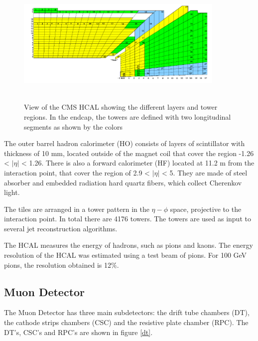 \begin{figure}[ht]
	\centering
	\includegraphics[width=10cm,height=6cm]{Chapter2/hcal.png}
	\caption[View of the CMS HCAL showing the different layers and tower regions. In the endcap, the towers are defined with two longitudinal segments as shown by the colors]{View of the CMS HCAL showing the different layers and tower regions. In the endcap, the towers are defined with two longitudinal segments as shown by the colors\cite{cms-manual}}\label{hcal}
\end{figure}
The outer barrel hadron calorimeter (HO) consists of layers of scintillator with thickness of 10 mm, located outside of the
magnet coil that cover the region -1.26 < $|\eta|$ < 1.26.
There is also a forward calorimeter (HF) located at 11.2 m from the interaction point, that cover the region of 2.9 < $|\eta|$ < 5. They are made of
steel absorber and embedded radiation hard quartz fibers, which collect
Cherenkov light\cite{cms-manual}.%

The tiles are arranged in a tower pattern in the $\eta-\phi$ space, projective to the interaction point. In total there
are 4176 towers. The towers are used as input to several jet reconstruction algorithms.

The HCAL measures the energy of hadrons, such as pions and kaons. 
The energy resolution of the HCAL was estimated using a test beam of pions. For 100 GeV pions, the resolution obtained is 12$\%$.

\subsection{Muon Detector}
The Muon Detector has three main subdetectors: the drift tube chambers (DT), the cathode strips chambers (CSC) and the resistive plate chamber (RPC). 
The DT's, CSC's and RPC's are shown in figure \ref{dt}.
 
